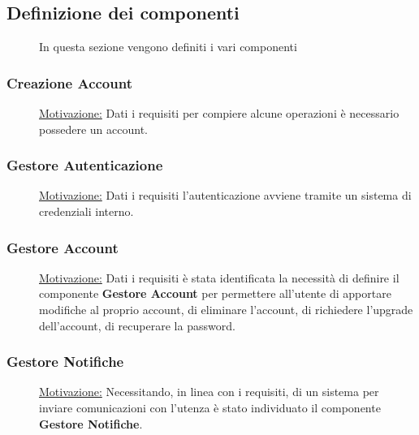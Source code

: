 \documentclass{article}
\begin{document}
\subsection{Definizione dei componenti}
\begin{description}
    \item[] In questa sezione vengono definiti i vari componenti
\end{description}
\subsubsection{Creazione Account}
\begin{description}
    \item[] \underline{Motivazione:}
        Dati i requisiti per compiere alcune operazioni è necessario possedere un account.
\end{description}
\subsubsection{Gestore Autenticazione}
\begin{description}
    \item[] \underline{Motivazione:} Dati i requisiti l'autenticazione avviene tramite un sistema di credenziali interno. \\
\end{description}
\subsubsection{Gestore Account}
\begin{description}
    \item[] \underline{Motivazione:}
        Dati i requisiti è stata identificata la necessità di definire il componente \textbf{Gestore Account} per permettere all'utente di apportare modifiche al proprio account, di eliminare l'account, di richiedere l'upgrade dell'account, di recuperare la password.
\end{description}
\subsubsection{Gestore Notifiche}
\begin{description}
    \item[] \underline{Motivazione:}
        Necessitando, in linea con i requisiti, di un sistema per inviare comunicazioni con l'utenza è stato individuato il componente \textbf{Gestore Notifiche}.
\end{description}
\end{document}
